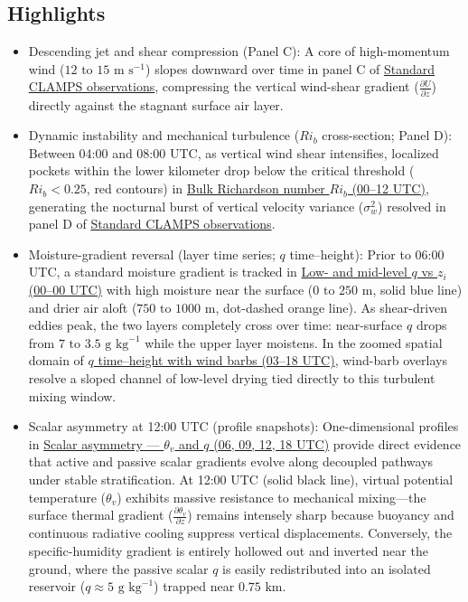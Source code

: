 \documentclass[11pt]{article}
\begin{document}
\subsection*{Highlights}
\begin{itemize}
  \item Descending jet and shear compression (Panel C): A core of high-momentum wind ($12\text{ to }15\text{ m s}^{-1}$) slopes downward over time in panel C of \hyperref[fig:sharp_grad_c2:sharp_grad_c2_instrument_template_4panel]{Standard CLAMPS observations}, compressing the vertical wind-shear gradient ($\frac{\partial U}{\partial z}$) directly against the stagnant surface air layer.
  \item Dynamic instability and mechanical turbulence ($Ri_b$ cross-section; Panel D): Between 04:00 and 08:00 UTC, as vertical wind shear intensifies, localized pockets within the lower kilometer drop below the critical threshold ($Ri_b < 0.25$, red contours) in \hyperref[fig:sharp_grad_c2:sharp_grad_c2_aux_rib_timeheight]{Bulk Richardson number $Ri_b$ (00–12 UTC)}, generating the nocturnal burst of vertical velocity variance ($\sigma_w^2$) resolved in panel D of \hyperref[fig:sharp_grad_c2:sharp_grad_c2_instrument_template_4panel]{Standard CLAMPS observations}.
  \item Moisture-gradient reversal (layer time series; $q$ time–height): Prior to 06:00 UTC, a standard moisture gradient is tracked in \hyperref[fig:sharp_grad_c2:sharp_grad_c2_aux_q_zi_timeseries]{Low- and mid-level $q$ vs $z_i$ (00–00 UTC)} with high moisture near the surface ($0\text{ to }250\text{ m}$, solid blue line) and drier air aloft ($750\text{ to }1000\text{ m}$, dot-dashed orange line). As shear-driven eddies peak, the two layers completely cross over time: near-surface $q$ drops from $7\text{ to }3.5\text{ g kg}^{-1}$ while the upper layer moistens. In the zoomed spatial domain of \hyperref[fig:sharp_grad_c2:sharp_grad_c2_aux_q_wind_timeheight]{$q$ time–height with wind barbs (03–18 UTC)}, wind-barb overlays resolve a sloped channel of low-level drying tied directly to this turbulent mixing window.
  \item Scalar asymmetry at 12:00 UTC (profile snapshots): One-dimensional profiles in \hyperref[fig:sharp_grad_c2:sharp_grad_c2_aux_scalar_asymmetry_profiles]{Scalar asymmetry — $\theta_v$ and $q$ (06, 09, 12, 18 UTC)} provide direct evidence that active and passive scalar gradients evolve along decoupled pathways under stable stratification. At 12:00 UTC (solid black line), virtual potential temperature ($\theta_v$) exhibits massive resistance to mechanical mixing—the surface thermal gradient ($\frac{\partial \theta_v}{\partial z}$) remains intensely sharp because buoyancy and continuous radiative cooling suppress vertical displacements. Conversely, the specific-humidity gradient is entirely hollowed out and inverted near the ground, where the passive scalar $q$ is easily redistributed into an isolated reservoir ($q \approx 5\text{ g kg}^{-1}$) trapped near $0.75\text{ km}$.

\end{itemize}
\end{document}
